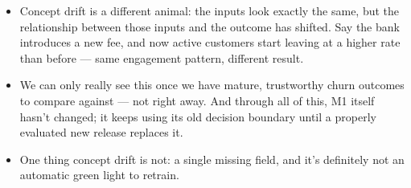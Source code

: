 \documentclass[11pt,a4paper]{article}
\begin{document}
\begin{examplebox}[title after break={SPOKEN SCRIPT --- slide 19 continued}]
\begin{itemize}
\item Concept drift is a different animal: the inputs look exactly the same, but the relationship between those inputs and the outcome has shifted. Say the bank introduces a new fee, and now active customers start leaving at a higher rate than before — same engagement pattern, different result.
\item We can only really see this once we have mature, trustworthy churn outcomes to compare against — not right away. And through all of this, M1 itself hasn't changed; it keeps using its old decision boundary until a properly evaluated new release replaces it.
\item One thing concept drift is not: a single missing field, and it's definitely not an automatic green light to retrain.
\end{itemize}
\end{examplebox}
\par\noindent{\scriptsize\textcolor{teal!60!black}{Reading anchor: Bass, Ch. 11 / §14.1.5 · Schematic relationships}}
\clearpage
\end{document}
